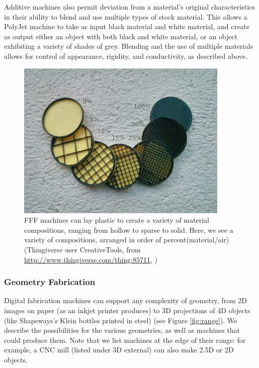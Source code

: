 Additive machines also permit deviation from a material's original characteristics in their ability to blend and use multiple types of stock material. This allows a PolyJet machine to take as input black material and white material, and create as output either an object with both black and white material, or an object exhibiting a variety of shades of grey. Blending and the use of multiple materials allows for control of appearance, rigidity, and conductivity, as described above.

\begin{figure}
\centering
\includegraphics[width=4in]{figures/infills.jpg}
\caption{FFF machines can lay plastic to create a variety of material compositions, ranging from hollow to sparse to solid. Here, we see a variety of compositions, arranged in order of percent(material/air) (Thingiverse user CreativeTools, from \url{http://www.thingiverse.com/thing:85711}, \ccby)}
\label{fig:composition}
\end{figure}

\subsubsection{Geometry Fabrication}

Digital fabrication machines can support any complexity of geometry, from 2D images on paper (as an inkjet printer produces) to 3D projections of 4D objects (like Shapeways's Klein bottles printed in steel) (see Figure \ref{fig:range}). We describe the possibilities for the various geometries, as well as machines that could produce them. Note that we list machines at the edge of their range: for example, a CNC mill (listed under 3D external) can also make 2.5D or 2D objects.

